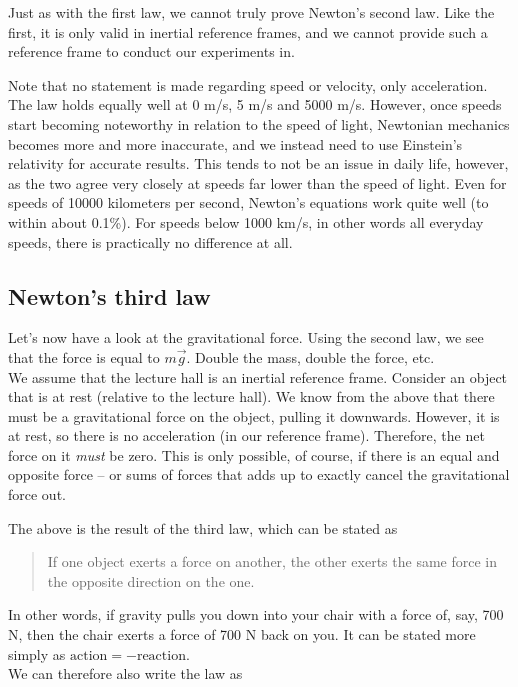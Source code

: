 \documentclass[12pt,a4paper]{report}
\begin{document}
Just as with the first law, we cannot truly prove Newton's second law. Like the first, it is only valid in inertial reference frames, and we cannot provide such a reference frame to conduct our experiments in.

Note that no statement is made regarding speed or velocity, only acceleration. The law holds equally well at 0 m/s, 5 m/s and 5000 m/s. However, once speeds start becoming noteworthy in relation to the speed of light, Newtonian mechanics becomes more and more inaccurate, and we instead need to use Einstein's relativity for accurate results. This tends to not be an issue in daily life, however, as the two agree very closely at speeds far lower than the speed of light. Even for speeds of 10000 kilometers per second, Newton's equations work quite well (to within about 0.1\%). For speeds below 1000 km/s, in other words all everyday speeds, there is practically no difference at all.

\subsection{Newton's third law}

Let's now have a look at the gravitational force. Using the second law, we see that the force is equal to $m \vec{g}$. Double the mass, double the force, etc.\\
We assume that the lecture hall is an inertial reference frame. Consider an object that is at rest (relative to the lecture hall). We know from the above that there must be a gravitational force on the object, pulling it downwards. However, it is at rest, so there is no acceleration (in our reference frame). Therefore, the net force on it \emph{must} be zero. This is only possible, of course, if there is an equal and opposite force -- or sums of forces that adds up to exactly cancel the gravitational force out.

The above is the result of the third law, which can be stated as

\begin{quote}
If one object exerts a force on another, the other exerts the same force in the opposite direction on the one.
\end{quote}

In other words, if gravity pulls you down into your chair with a force of, say, 700 N, then the chair exerts a force of 700 N back on you. It can be stated more simply as $\text{action} = -\text{reaction}$.\\
We can therefore also write the law as
\end{document}
